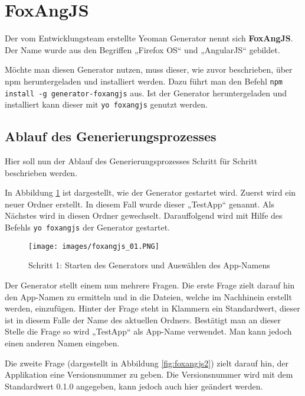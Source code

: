 \section{FoxAngJS}

Der vom Entwicklungsteam erstellte Yeoman Generator nennt sich \textbf{FoxAngJS}.
Der Name wurde aus den Begriffen „Firefox OS“ und „AngularJS“ gebildet.

Möchte man diesen Generator nutzen, muss dieser, wie zuvor beschrieben, über npm heruntergeladen und installiert werden.
Dazu führt man den Befehl \texttt{npm install -g generator-foxangjs} aus.
Ist der Generator heruntergeladen und installiert kann dieser mit \texttt{yo foxangjs} genutzt werden.

\subsection{Ablauf des Generierungsprozesses}

Hier soll nun der Ablauf des Generierungsprozesses Schritt für Schritt beschrieben werden.

In Abbildung \ref{fig:foxangjs1} ist dargestellt, wie der Generator gestartet wird.
Zuerst wird ein neuer Ordner erstellt. 
In diesem Fall wurde dieser „TestApp“ genannt.
Als Nächstes wird in diesen Ordner gewechselt.
Darauffolgend wird mit Hilfe des Befehls \texttt{yo foxangjs} der Generator gestartet.

\begin{figure}[!ht]
  \centering
    \texttt{[image: images/foxangjs\_01.PNG]}\\
  \caption{Schritt 1: Starten des Generators und Auswählen des App-Namens}
  \label{fig:foxangjs1}
\end{figure}

Der Generator stellt einem nun mehrere Fragen.
Die erste Frage zielt darauf hin den App-Namen zu ermitteln und in die Dateien, welche im Nachhinein erstellt werden, einzufügen.
Hinter der Frage steht in Klammern ein Standardwert, dieser ist in diesem Falle der Name des aktuellen Ordners.
Bestätigt man an dieser Stelle die Frage so wird „TestApp“ als App-Name verwendet.
Man kann jedoch einen anderen Namen eingeben.

Die zweite Frage (dargestellt in Abbildung \ref{fig:foxangjs2}) zielt darauf hin, der Applikation eine Versionsnummer zu geben.
Die Versionsnummer wird mit dem Standardwert 0.1.0 angegeben, kann jedoch auch hier geändert werden. \\

